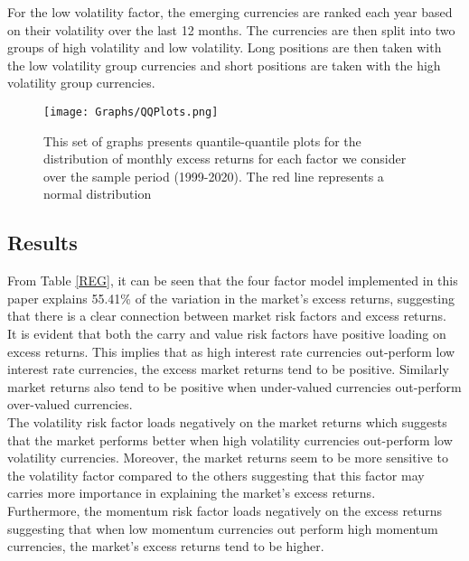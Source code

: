 \documentclass{article}
\begin{document}
For the low volatility factor, the emerging currencies are ranked each year based on their volatility over the last 12 months. The currencies are then split into two groups of high volatility and low volatility. Long positions are then taken with the low volatility group currencies and short positions are taken with the high volatility group currencies.\\

\begin{figure}[ht!]
    \centering
    \texttt{[image: Graphs/QQPlots.png]}
    \caption{This set of graphs presents quantile-quantile plots for the distribution of monthly excess returns for each factor we consider over the sample period (1999-2020). The red line represents a normal distribution}
    \label{fig:my_label}
\end{figure}



\subsection{Results}
From Table \ref{REG}, it can be seen that the four factor model implemented in this paper explains 55.41\% of the variation in the market's excess returns, suggesting that there is a clear connection between market risk factors and excess returns.\\

It is evident that both the carry and value risk factors have positive loading on excess returns. This implies that as high interest rate currencies out-perform low interest rate currencies, the excess market returns tend to be positive. Similarly market returns also tend to be positive when under-valued currencies out-perform over-valued currencies.\\

The volatility risk factor loads negatively on the market returns which suggests that the market performs better when high volatility currencies out-perform low volatility currencies. Moreover, the market returns seem to be more sensitive to the volatility factor compared to the others suggesting that this factor may carries more importance in explaining the market's excess returns.\\

Furthermore, the momentum risk factor loads negatively on the excess returns suggesting that when low momentum currencies out perform high momentum currencies, the market's excess returns tend to be higher. \\
\end{document}
